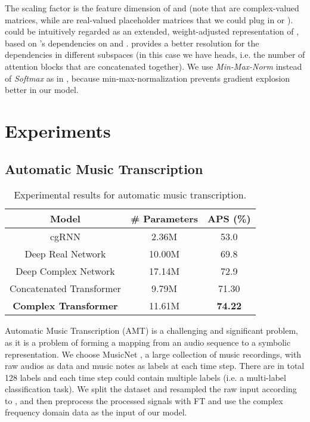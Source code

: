 \documentclass{article}
\begin{document}
The scaling factor  is the feature dimension of  and  (note that  are complex-valued matrices, while  are real-valued placeholder matrices that we could plug in  or ).  could be intuitively regarded as an extended, weight-adjusted representation of , based on 's dependencies on  and .   provides a better resolution for the dependencies in different subspaces \cite{tsaikernel} (in this case we have  heads, i.e. the number of attention blocks that are concatenated together). We use \textit{Min-Max-Norm} instead of \textit{Softmax} as in \cite{vaswani2017attention}, because min-max-normalization prevents gradient explosion better in our model.

\section{Experiments}

\subsection{Automatic Music Transcription}

\begin{table}
\centering
\caption{Experimental results for automatic music transcription.}
\begin{tabular}{c c c}
\toprule
 Model & \# Parameters & APS (\%)  \\
\midrule
cgRNN \cite{wolter2018complex} & 2.36M & 53.0 \\
Deep Real Network \cite{trabelsi2017deep} & 10.00M & 69.8 \\
Deep Complex Network \cite{trabelsi2017deep} & 17.14M & 72.9 \\
Concatenated Transformer & 9.79M & 71.30 \\
\textbf{Complex Transformer} & 11.61M & \textbf{74.22} \\
\bottomrule
\end{tabular}
\label{tab:result_music}
\end{table}

Automatic Music Transcription (AMT) is a challenging and significant problem, as it is a problem of forming a mapping from an audio sequence to a symbolic representation. We choose MusicNet \cite{thickstun2016learning}, a large collection of music recordings, with raw audios as data and music notes as labels at each time step. There are in total 128 labels and each time step could contain multiple labels (i.e. a multi-label classification task). We split the dataset and resampled the raw input according to \cite{trabelsi2017deep}, and then preprocess the processed signals with FT and use the complex frequency domain data as the input of our model. 
\end{document}
